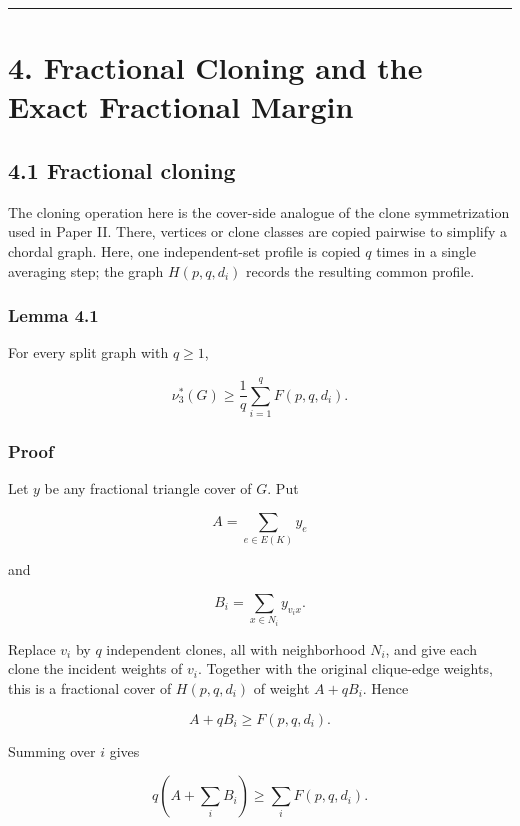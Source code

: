 \documentclass[
  11pt,
]{article}
\begin{document}
\begin{center}\rule{0.5\linewidth}{0.5pt}\end{center}

\section{4. Fractional Cloning and the Exact Fractional
Margin}\label{fractional-cloning-and-the-exact-fractional-margin}

\subsection{4.1 Fractional cloning}\label{fractional-cloning}

The cloning operation here is the cover-side analogue of the clone
symmetrization used in Paper II. There, vertices or clone classes are
copied pairwise to simplify a chordal graph. Here, one independent-set
profile is copied \(q\) times in a single averaging step; the graph
\(H(p,q,d_i)\) records the resulting common profile.

\subsubsection{Lemma 4.1}\label{lemma-4.1-fractional-cloning-bound}

For every split graph with \(q\ge1\),

\[
\boxed{
\nu_3^*(G)
\ge
\frac1q\sum_{i=1}^qF(p,q,d_i).
}
\tag{4.1}
\]

\subsubsection{Proof}\label{proof-1}

Let \(y\) be any fractional triangle cover of \(G\). Put

\[
A=\sum_{e\in E(K)}y_e
\]

and

\[
B_i=\sum_{x\in N_i}y_{v_ix}.
\]

Replace \(v_i\) by \(q\) independent clones, all with neighborhood
\(N_i\), and give each clone the incident weights of \(v_i\). Together
with the original clique-edge weights, this is a fractional cover of
\(H(p,q,d_i)\) of weight \(A+qB_i\). Hence

\[
A+qB_i\ge F(p,q,d_i).
\]

Summing over \(i\) gives

\[
q\left(A+\sum_iB_i\right)
\ge
\sum_iF(p,q,d_i).
\]
\end{document}
